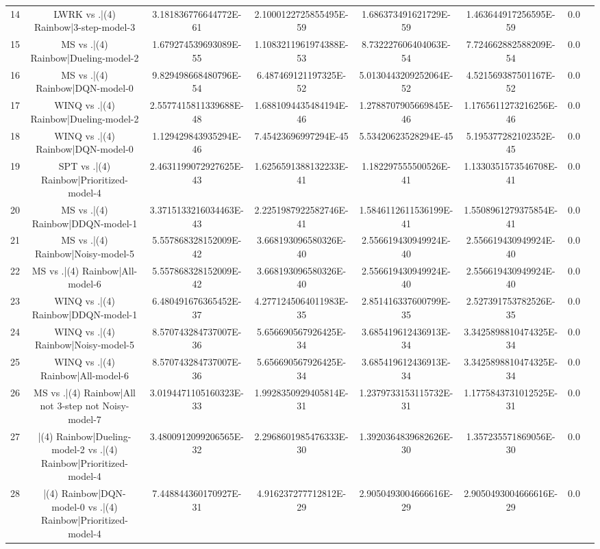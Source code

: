 \documentclass[a3paper,10pt]{article}
\begin{document}
\begin{table}[!htp]
\begin{tabular}{cccccccc}
14&LWRK vs .|(4) Rainbow|3-step-model-3&3.181836776644772E-61&2.1000122725855495E-59&1.686373491621729E-59&1.463644917256595E-59&0.0\\
15&MS vs .|(4) Rainbow|Dueling-model-2&1.679274539693089E-55&1.1083211961974388E-53&8.732227606404063E-54&7.724662882588209E-54&0.0\\
16&MS vs .|(4) Rainbow|DQN-model-0&9.829498668480796E-54&6.487469121197325E-52&5.0130443209252064E-52&4.521569387501167E-52&0.0\\
17&WINQ vs .|(4) Rainbow|Dueling-model-2&2.5577415811339688E-48&1.6881094435484194E-46&1.2788707905669845E-46&1.1765611273216256E-46&0.0\\
18&WINQ vs .|(4) Rainbow|DQN-model-0&1.129429843935294E-46&7.45423696997294E-45&5.53420623528294E-45&5.195377282102352E-45&0.0\\
19&SPT vs .|(4) Rainbow|Prioritized-model-4&2.4631199072927625E-43&1.6256591388132233E-41&1.182297555500526E-41&1.1330351573546708E-41&0.0\\
20&MS vs .|(4) Rainbow|DDQN-model-1&3.3715133216034463E-43&2.2251987922582746E-41&1.5846112611536199E-41&1.5508961279375854E-41&0.0\\
21&MS vs .|(4) Rainbow|Noisy-model-5&5.557868328152009E-42&3.668193096580326E-40&2.556619430949924E-40&2.556619430949924E-40&0.0\\
22&MS vs .|(4) Rainbow|All-model-6&5.557868328152009E-42&3.668193096580326E-40&2.556619430949924E-40&2.556619430949924E-40&0.0\\
23&WINQ vs .|(4) Rainbow|DDQN-model-1&6.480491676365452E-37&4.2771245064011983E-35&2.851416337600799E-35&2.527391753782526E-35&0.0\\
24&WINQ vs .|(4) Rainbow|Noisy-model-5&8.570743284737007E-36&5.656690567926425E-34&3.685419612436913E-34&3.3425898810474325E-34&0.0\\
25&WINQ vs .|(4) Rainbow|All-model-6&8.570743284737007E-36&5.656690567926425E-34&3.685419612436913E-34&3.3425898810474325E-34&0.0\\
26&MS vs .|(4) Rainbow|All not 3-step not Noisy-model-7&3.0194471105160323E-33&1.9928350929405814E-31&1.2379733153115732E-31&1.1775843731012525E-31&0.0\\
27&|(4) Rainbow|Dueling-model-2 vs .|(4) Rainbow|Prioritized-model-4&3.4800912099206565E-32&2.2968601985476333E-30&1.3920364839682626E-30&1.357235571869056E-30&0.0\\
28&|(4) Rainbow|DQN-model-0 vs .|(4) Rainbow|Prioritized-model-4&7.448844360170927E-31&4.916237277712812E-29&2.9050493004666616E-29&2.9050493004666616E-29&0.0\\

\end{tabular}
\end{table}
\end{document}
